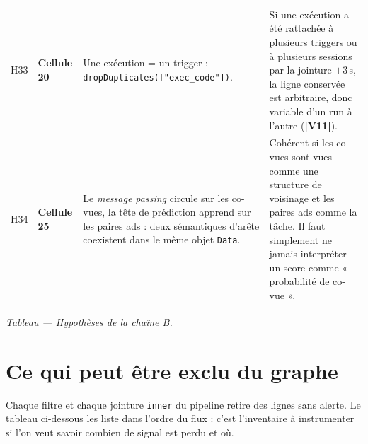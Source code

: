 \documentclass[11pt,a4paper]{article}
\newcommand{\code}[1]{\texttt{\small #1}}
\newcommand{\hyp}[1]{\textcolor{hypcol}{\textbf{\small [#1]}}}
\newcommand{\cell}[1]{\textbf{Cellule #1}}
\begin{document}
{\begin{longtable}{@{}l p{2.45cm} p{5.9cm} p{4.5cm}@{}}
\addlinespace
H33 & \cell{20} & Une exécution = un trigger : \code{dropDuplicates(["exec\_code"])}. & Si une exécution a été rattachée à plusieurs triggers ou à plusieurs sessions par la jointure $\pm 3$\,s, la ligne conservée est arbitraire, donc variable d'un run à l'autre (\hyp{V11}). \\
\addlinespace
H34 & \cell{25} & Le \emph{message passing} circule sur les co-vues, la tête de prédiction apprend sur les paires ads : deux sémantiques d'arête coexistent dans le même objet \code{Data}. & Cohérent si les co-vues sont vues comme une structure de voisinage et les paires ads comme la tâche. Il faut simplement ne jamais interpréter un score comme « probabilité de co-vue ». \\

\end{longtable}
}
\label{tab:hyp-b}
\begin{center}\footnotesize\itshape Tableau \thetable{} --- Hypothèses de la chaîne B.\end{center}

\clearpage
\section{Ce qui peut être exclu du graphe}
\label{sec:exclusions}

Chaque filtre et chaque jointure \code{inner} du pipeline retire des lignes sans
alerte. Le tableau ci-dessous les liste dans l'ordre du flux : c'est l'inventaire à
instrumenter si l'on veut savoir combien de signal est perdu et où.
\end{document}
